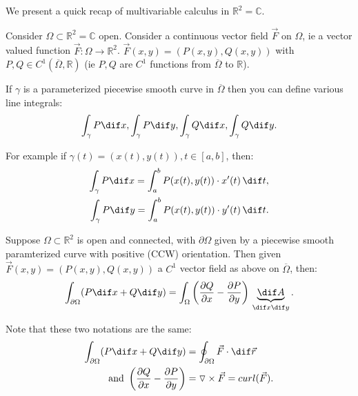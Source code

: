 We present a quick recap of multivariable calculus in $\mathbb{R}^2 = \mathbb{C}$.

Consider $\Omega \subset \mathbb{R}^2 = \mathbb{C}$ open. Consider a continuous vector field $\Vec{F}$ on $\Omega$, ie a vector valued function $\Vec{F}:\Omega \rightarrow \mathbb{R}^2$. $\Vec{F}(x,y) = (P(x,y),Q(x,y))$ with $P,Q \in C^1(\overline{\Omega},\mathbb{R})$ (ie $P,Q$ are $C^1$ functions from $\overline{\Omega}$ to $\mathbb{R}$).

If $\gamma$ is a parameterized piecewise smooth curve in $\overline{\Omega}$ then you can define various line integrals:
\begin{align*}
    \int_\gamma P  \dif x , \int_\gamma P  \dif y,\int_\gamma Q  \dif x , \int_\gamma Q  \dif y.
\end{align*}

For example if $\gamma(t) = (x(t),y(t)), t\in[a,b]$, then:
\begin{align*}
    \int_\gamma P  \dif x = \int_a^b P(x(t),y(t))\cdot x'(t) \,  \dif t, \\
    \int_\gamma P  \dif y = \int_a^b P(x(t),y(t))\cdot y'(t) \,  \dif t.
\end{align*}


\begin{theorem}
Suppose $\Omega \subset \mathbb{R}^2$ is open and connected, with $\partial \Omega$ given by a piecewise smooth paramterized curve with positive (CCW) orientation. Then given $\Vec{F}(x,y) = (P(x,y),Q(x,y))$ a $C^1$ vector field as above on $\overline{\Omega}$, then:
\begin{align*}
    \int_{\partial \Omega} (P \dif x + Q \dif y) = \int_\Omega \left( \frac{\partial Q}{\partial x} - \frac{\partial P}{\partial y}  \right) \, \underbrace{ \dif A}_{ \dif x \dif y}.
\end{align*}
\end{theorem}

\begin{note}
Note that these two notations are the same:
\begin{align*}
    \int_{\partial \Omega} (P \dif x + Q \dif y) &= \oint_{\partial \Omega}\Vec{F}\cdot  \dif \Vec{r}\\
    \text{and } \left( \frac{\partial Q}{\partial x} - \frac{\partial P}{\partial y}  \right) &= \triangledown \times \Vec{F} = curl(\Vec{F}).
\end{align*}
\end{note}